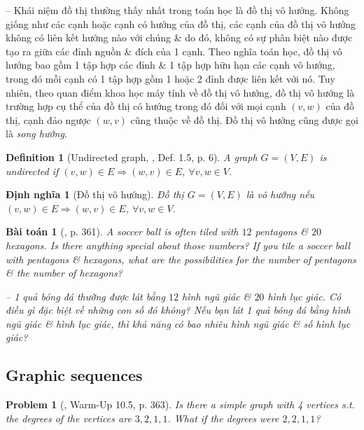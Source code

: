 \documentclass[oneside]{book}
\newtheorem{baitoan}{Bài toán}
\newtheorem{definition}{Definition}
\newtheorem{dinhnghia}{Định nghĩa}
\newtheorem{problem}{Problem}
\begin{document}
-- Khái niệm đồ thị thường thấy nhất trong toán học là đồ thị vô hướng. Không giống như các cạnh hoặc cạnh có hướng của đồ thị, các cạnh của đồ thị vô hướng không có liên kết hướng nào với chúng \& do đó, không có sự phân biệt nào được tạo ra giữa các đỉnh nguồn \& đích của 1 cạnh. Theo nghĩa toán học, đồ thị vô hướng bao gồm 1 tập hợp các đỉnh \& 1 tập hợp hữu hạn các cạnh vô hướng, trong đó mỗi cạnh có 1 tập hợp gồm 1 hoặc 2 đỉnh được liên kết với nó. Tuy nhiên, theo quan điểm khoa học máy tính về đồ thị vô hướng, đồ thị vô hướng là trường hợp cụ thể của đồ thị có hướng trong đó đối với mọi cạnh $(v,w)$ của đồ thị, cạnh đảo ngược $(w,v)$ cũng thuộc về đồ thị. Đồ thị vô hướng cũng được gọi là {\it song hướng}.

\begin{definition}[Undirected graph, \cite{Valiente2021}, Def. 1.5, p. 6]
	A graph $G = (V,E)$ is {\rm undirected} if $(v,w)\in E\Rightarrow(w,v)\in E$, $\forall v,w\in V$.
\end{definition}

\begin{dinhnghia}[Đồ thị vô hướng]
	Đồ thị $G = (V,E)$ là {\rm vô hướng} nếu $(v,w)\in E\Rightarrow(w,v)\in E$, $\forall v,w\in V$.
\end{dinhnghia}

\begin{baitoan}[\cite{Shahriari2022}, p. 361]
	A soccer ball is often tiled with $12$ pentagons \& $20$ hexagons. Is there anything special about those numbers? If you tile a soccer ball with pentagons \& hexagons, what are the possibilities for the number of pentagons \& the number of hexagons?
	
	-- 1 quả bóng đá thường được lát bằng $12$ hình ngũ giác \& $20$ hình lục giác. Có điều gì đặc biệt về những con số đó không? Nếu bạn lát 1 quả bóng đá bằng hình ngũ giác \& hình lục giác, thì khả năng có bao nhiêu hình ngũ giác \& số hình lục giác?
\end{baitoan}

\subsection{Graphic sequences}

\begin{problem}[\cite{Shahriari2022}, Warm-Up 10.5, p. 363]
	Is there a simple graph with 4 vertices s.t. the degrees of the vertices are $3,2,1,1$. What if the degrees were $2,2,1,1$?
\end{problem}
\end{document}
